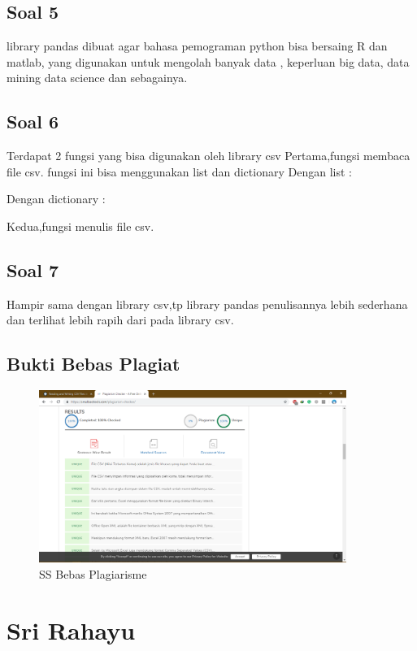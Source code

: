 \subsection{Soal 5}
library pandas dibuat agar bahasa pemograman python bisa bersaing R dan matlab, yang digunakan untuk mengolah banyak data , keperluan big data, data mining data science dan sebagainya.

\subsection{Soal 6}
Terdapat 2 fungsi yang bisa digunakan oleh library csv
Pertama,fungsi membaca file csv.
fungsi ini bisa menggunakan list dan dictionary
Dengan list :

Dengan dictionary :

Kedua,fungsi menulis file csv.


\subsection{Soal 7}
Hampir sama dengan library csv,tp library pandas penulisannya lebih sederhana dan terlihat lebih rapih dari pada library csv.


\subsection{Bukti Bebas Plagiat}
\begin{figure}[H]
    \centering
    \includegraphics[width=10cm]{figures/4/1174027/teori/harunpla.png}
    \caption{SS Bebas Plagiarisme}
    \label{harun}
\end{figure}

\section{Sri Rahayu}
